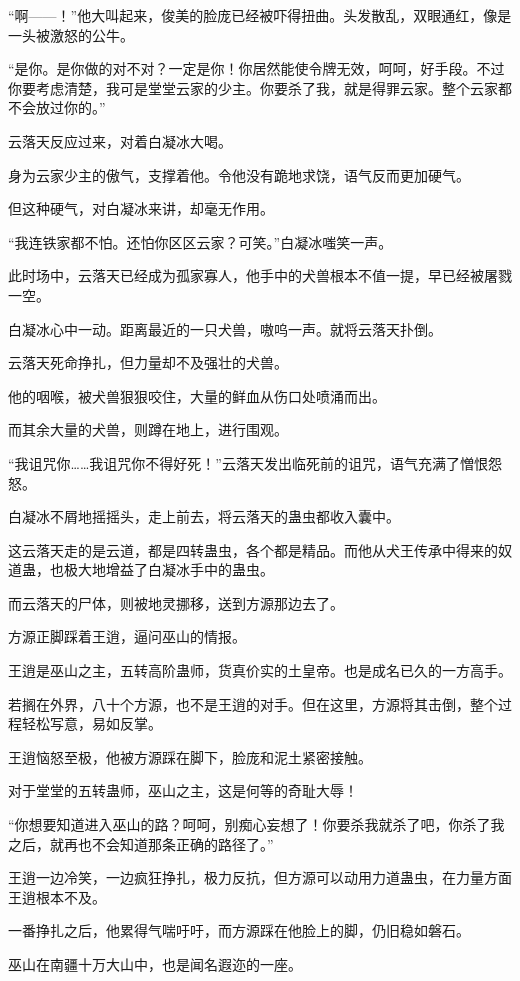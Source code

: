 \begin{this_body}
“啊——！”他大叫起来，俊美的脸庞已经被吓得扭曲。头发散乱，双眼通红，像是一头被激怒的公牛。

“是你。是你做的对不对？一定是你！你居然能使令牌无效，呵呵，好手段。不过你要考虑清楚，我可是堂堂云家的少主。你要杀了我，就是得罪云家。整个云家都不会放过你的。”

云落天反应过来，对着白凝冰大喝。

身为云家少主的傲气，支撑着他。令他没有跪地求饶，语气反而更加硬气。

但这种硬气，对白凝冰来讲，却毫无作用。

“我连铁家都不怕。还怕你区区云家？可笑。”白凝冰嗤笑一声。

此时场中，云落天已经成为孤家寡人，他手中的犬兽根本不值一提，早已经被屠戮一空。

白凝冰心中一动。距离最近的一只犬兽，嗷呜一声。就将云落天扑倒。

云落天死命挣扎，但力量却不及强壮的犬兽。

他的咽喉，被犬兽狠狠咬住，大量的鲜血从伤口处喷涌而出。

而其余大量的犬兽，则蹲在地上，进行围观。

“我诅咒你……我诅咒你不得好死！”云落天发出临死前的诅咒，语气充满了憎恨怨怒。

白凝冰不屑地摇摇头，走上前去，将云落天的蛊虫都收入囊中。

这云落天走的是云道，都是四转蛊虫，各个都是精品。而他从犬王传承中得来的奴道蛊，也极大地增益了白凝冰手中的蛊虫。

而云落天的尸体，则被地灵挪移，送到方源那边去了。

方源正脚踩着王逍，逼问巫山的情报。

王逍是巫山之主，五转高阶蛊师，货真价实的土皇帝。也是成名已久的一方高手。

若搁在外界，八十个方源，也不是王逍的对手。但在这里，方源将其击倒，整个过程轻松写意，易如反掌。

王逍恼怒至极，他被方源踩在脚下，脸庞和泥土紧密接触。

对于堂堂的五转蛊师，巫山之主，这是何等的奇耻大辱！

“你想要知道进入巫山的路？呵呵，别痴心妄想了！你要杀我就杀了吧，你杀了我之后，就再也不会知道那条正确的路径了。”

王逍一边冷笑，一边疯狂挣扎，极力反抗，但方源可以动用力道蛊虫，在力量方面王逍根本不及。

一番挣扎之后，他累得气喘吁吁，而方源踩在他脸上的脚，仍旧稳如磐石。

巫山在南疆十万大山中，也是闻名遐迩的一座。


\end{this_body}
